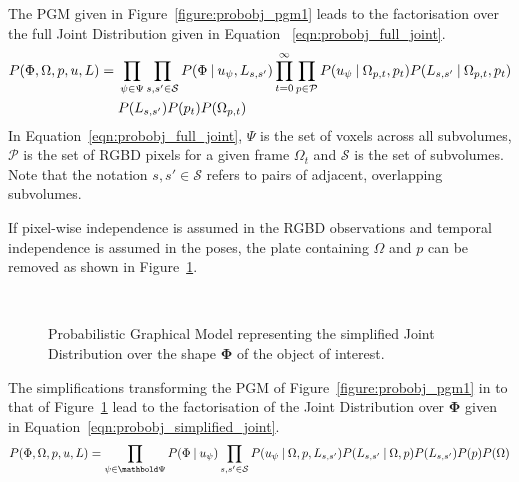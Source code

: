 The PGM given in Figure~\ref{figure:probobj_pgm1} leads to the
factorisation over the full Joint Distribution given in Equation
~\ref{eqn:probobj_full_joint}.
\begin{equation}
  \label{eqn:probobj_full_joint}
  \begin{split}
    P(\Phi, \Omega, p, u, L) ={}&
    \prod_{\psi \in \Psi}\prod_{s, s' \in \mathcal{S}}
    P(\Phi \:\vert\: u_{\psi}, L_{s, s'}) 
    \prod_{t=0}^{\infty}\prod_{p \in \mathcal{P}}
    P(u_{\psi} \:\vert\: \Omega_{p, t}, p_{t})
    P(L_{s, s'} \:\vert\: \Omega_{p, t}, p_{t})\\
    & P(L_{s, s'})P(p_{t})P(\Omega_{p, t})
  \end{split}
\end{equation}
In Equation~\ref{eqn:probobj_full_joint}, \( \Psi \) is the set of voxels
across all subvolumes, \(\mathcal{P}\) is the set of RGBD pixels for a given 
frame \(\Omega_{t}\) and \(\mathcal{S}\) is the set of subvolumes. Note that the 
notation \(s, s' \in \mathcal{S}\) refers to pairs of adjacent, overlapping 
subvolumes.

If pixel-wise independence is assumed in the RGBD observations and temporal
independence is assumed in the poses, the plate containing \( \Omega \) and \(p\) can
be removed as shown in Figure~\ref{figure:probobj_pgm2}.
\begin{figure}[!htbp]
  \centering
  \caption[Probabilistic Object Reconstruction Formulation II]
  {Probabilistic Graphical Model representing the simplified Joint
    Distribution over the shape \(\bm{\Phi}\) of the object of interest.}
~\label{figure:probobj_pgm2}
\end{figure}

The simplifications transforming the PGM of Figure~\ref{figure:probobj_pgm1} in to
that of Figure~\ref{figure:probobj_pgm2} lead to the factorisation of the
Joint Distribution over \(\bm{\Phi}\) given in Equation~\ref{eqn:probobj_simplified_joint}.
\begin{equation}
  \label{eqn:probobj_simplified_joint}
  P(\Phi, \Omega, p, u, L) = 
  \prod_{\psi \in \bm{\Psi}}P(\Phi \given u_{\psi})
  \prod_{s, s' \in \mathcal{S}}P(u_{\psi} \given \Omega, p, L_{s, s'})
  P(L_{s, s'} \given \Omega, p) P(L_{s, s'})P(p)P(\Omega)
\end{equation}

